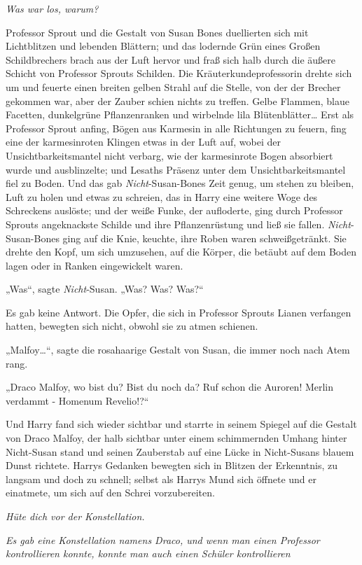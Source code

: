 {\emph{Was war los, warum?}

Professor Sprout und die Gestalt von Susan Bones duellierten sich mit Lichtblitzen und lebenden Blättern; und das lodernde Grün eines Großen Schildbrechers brach aus der Luft hervor und fraß sich halb durch die äußere Schicht von Professor Sprouts Schilden. Die Kräuterkundeprofessorin drehte sich um und feuerte einen breiten gelben Strahl auf die Stelle, von der der Brecher gekommen war, aber der Zauber schien nichts zu treffen. Gelbe Flammen, blaue Facetten, dunkelgrüne Pflanzenranken und wirbelnde lila Blütenblätter… Erst als Professor Sprout anfing, Bögen aus Karmesin in alle Richtungen zu feuern, fing eine der karmesinroten Klingen etwas in der Luft auf, wobei der Unsichtbarkeitsmantel nicht verbarg, wie der karmesinrote Bogen absorbiert wurde und ausblinzelte; und Lesaths Präsenz unter dem Unsichtbarkeitsmantel fiel zu Boden. Und das gab \emph{Nicht}-Susan-Bones Zeit genug, um stehen zu bleiben, Luft zu holen und etwas zu schreien, das in Harry eine weitere Woge des Schreckens auslöste; und der weiße Funke, der aufloderte, ging durch Professor Sprouts angeknackste Schilde und ihre Pflanzenrüstung und ließ sie fallen. \emph{Nicht}-Susan-Bones ging auf die Knie, keuchte, ihre Roben waren schweißgetränkt. Sie drehte den Kopf, um sich umzusehen, auf die Körper, die betäubt auf dem Boden lagen oder in Ranken eingewickelt waren.

„Was“, sagte \emph{Nicht}-Susan. „Was? Was? Was?“

Es gab keine Antwort. Die Opfer, die sich in Professor Sprouts Lianen verfangen hatten, bewegten sich nicht, obwohl sie zu atmen schienen.

„Malfoy…“, sagte die rosahaarige Gestalt von Susan, die immer noch nach Atem rang.

„Draco Malfoy, wo bist du? Bist du noch da? Ruf schon die Auroren! Merlin verdammt - Homenum Revelio!?“

Und Harry fand sich wieder sichtbar und starrte in seinem Spiegel auf die Gestalt von Draco Malfoy, der halb sichtbar unter einem schimmernden Umhang hinter Nicht-Susan stand und seinen Zauberstab auf eine Lücke in Nicht-Susans blauem Dunst richtete. Harrys Gedanken bewegten sich in Blitzen der Erkenntnis, zu langsam und doch zu schnell; selbst als Harrys Mund sich öffnete und er einatmete, um sich auf den Schrei vorzubereiten.

\emph{Hüte dich vor der Konstellation.}

\emph{Es gab eine Konstellation namens Draco, und wenn man einen Professor kontrollieren konnte, konnte man auch einen Schüler kontrollieren}

}
